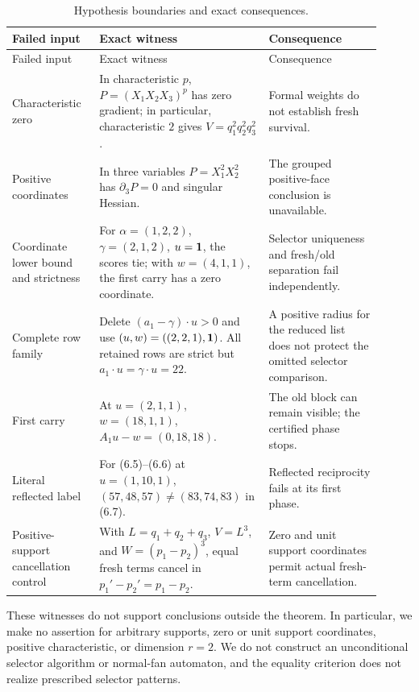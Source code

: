 \documentclass[11pt]{article}
\theoremstyle{definition}
\theoremstyle{remark}
\begin{document}
\begin{longtable}{@{}p{0.20\linewidth}p{0.42\linewidth}p{0.29\linewidth}@{}}
\caption{Hypothesis boundaries and exact consequences.}
\label{tab:boundaries}\\
\toprule
Failed input & Exact witness & Consequence\\
\midrule
\endfirsthead
\toprule
Failed input & Exact witness & Consequence\\
\midrule
\endhead
Characteristic zero &
In characteristic \(p\),
\(P=(X_1X_2X_3)^p\) has zero gradient; in particular, characteristic
\(2\) gives \(V=q_1^2q_2^2q_3^2\). &
Formal weights do not establish fresh survival.\\
\addlinespace
Positive coordinates &
In three variables \(P=X_1^2X_2^2\) has
\(\partial_3P=0\) and singular Hessian. &
The grouped positive-face conclusion is unavailable.\\
\addlinespace
Coordinate lower bound and strictness &
For \(\alpha=(1,2,2)\), \(\gamma=(2,1,2)\), \(u=\mathbf{1}\), the scores tie;
with \(w=(4,1,1)\), the first carry has a zero coordinate. &
Selector uniqueness and fresh/old separation fail independently.\\
\addlinespace
Complete row family &
Delete \((a_1-\gamma)\cdot u>0\) and use
\((u,w)=((2,2,1),\mathbf{1})\).  All retained rows are strict but
\(a_1\cdot u=\gamma\cdot u=22\). &
A positive radius for the reduced list does not protect the omitted
selector comparison.\\
\addlinespace
First carry &
At \(u=(2,1,1)\), \(w=(18,1,1)\),
\(A_1u-w=(0,18,18)\). &
The old block can remain visible; the certified phase stops.\\
\addlinespace
Literal reflected label &
For (6.5)--(6.6) at \(u=(1,10,1)\),
\((57,48,57)\neq(83,74,83)\) in (6.7). &
Reflected reciprocity fails at its first phase.\\
\addlinespace
Positive-support cancellation control &
With \(L=q_1+q_2+q_3\), \(V=L^3\), and
\(W=(p_1-p_2)^3\), equal fresh terms cancel in
\(p_1'-p_2'=p_1-p_2\). &
Zero and unit support coordinates permit actual fresh-term cancellation.\\
\bottomrule
\end{longtable}

These witnesses do not support conclusions outside the theorem.  In
particular, we make no assertion for arbitrary supports, zero or unit
support coordinates, positive characteristic, or dimension \(r=2\).  We
do not construct an unconditional selector algorithm or normal-fan
automaton, and the equality criterion does not realize prescribed
selector patterns.
\end{document}
